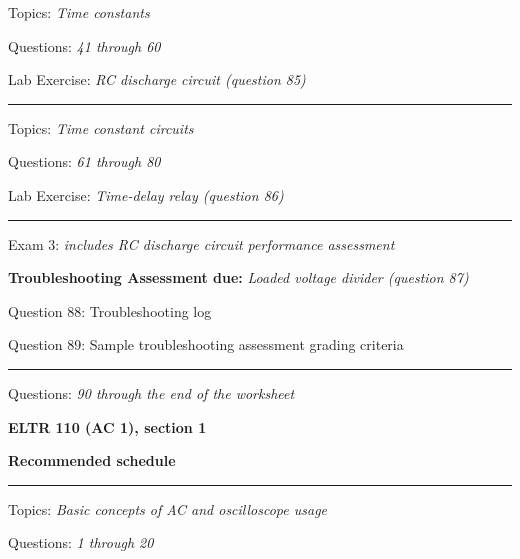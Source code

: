\hskip 10pt Topics: {\it Time constants}
 
\hskip 10pt Questions: {\it 41 through 60}
 
\hskip 10pt Lab Exercise: {\it RC discharge circuit (question 85)}
 


\vskip 10pt
\hrule \vskip 5pt
\noindent
{}

\hskip 10pt Topics: {\it Time constant circuits}
 
\hskip 10pt Questions: {\it 61 through 80}
 
\hskip 10pt Lab Exercise: {\it Time-delay relay (question 86)}
 
\vskip 10pt
\hrule \vskip 5pt
\noindent
{}

\hskip 10pt Exam 3: {\it includes RC discharge circuit performance assessment}
 
\hskip 10pt {\bf Troubleshooting Assessment due:} {\it Loaded voltage divider (question 87)}
 
\hskip 10pt Question 88: Troubleshooting log
 
\hskip 10pt Question 89: Sample troubleshooting assessment grading criteria
 
\vskip 10pt
\hrule \vskip 5pt
\noindent
{}

\hskip 10pt Questions: {\it 90 through the end of the worksheet}
 
\vskip 10pt







\vfil \eject

\centerline{\bf ELTR 110 (AC 1), section 1} \bigskip 
 
\vskip 10pt

\noindent
{\bf Recommended schedule}

\vskip 5pt

\hrule \vskip 5pt
\noindent
{}

\hskip 10pt Topics: {\it Basic concepts of AC and oscilloscope usage}
 
\hskip 10pt Questions: {\it 1 through 20}
 
